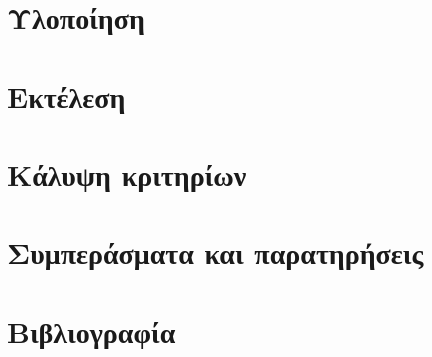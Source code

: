 \documentclass[12pt]{article}
\begin{document}
	\section{Υλοποίηση}
	
	\section{Εκτέλεση}
	
	
	\section{Κάλυψη κριτηρίων}
	
	\section{Συμπεράσματα και παρατηρήσεις}
	
	\section{Βιβλιογραφία}

	
	
	
\end{document}
